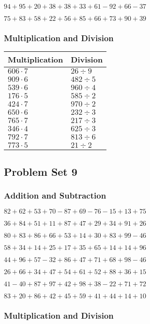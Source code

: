 \(94+95+20+38+38+33+61-92+66-37\)

\(75+83+58+22+56+85+66+73+90+39\)

\hypertarget{multiplication-and-division-7}{%
\subsubsection{Multiplication and
Division}\label{multiplication-and-division-7}}

\begin{longtable}[]{@{}ll@{}}
\toprule
Multiplication & Division\tabularnewline
\midrule
\endhead
\(606\cdot7\) & \(26÷9\)\tabularnewline
\(909\cdot6\) & \(482÷5\)\tabularnewline
\(539\cdot6\) & \(960÷4\)\tabularnewline
\(176\cdot5\) & \(585÷2\)\tabularnewline
\(424\cdot7\) & \(970÷2\)\tabularnewline
\(650\cdot6\) & \(232÷3\)\tabularnewline
\(765\cdot7\) & \(217÷3\)\tabularnewline
\(346\cdot4\) & \(625÷3\)\tabularnewline
\(792\cdot7\) & \(813÷6\)\tabularnewline
\(773\cdot5\) & \(21÷2\)\tabularnewline
\bottomrule
\end{longtable}

\hypertarget{problem-set-9}{%
\subsection{Problem Set 9}\label{problem-set-9}}

\hypertarget{addition-and-subtraction-8}{%
\subsubsection{Addition and
Subtraction}\label{addition-and-subtraction-8}}

\(82+62+53+70-87+69-76-15+13+75\)

\(36+84+51+11+87+47+29+34+91+26\)

\(80+83+86+66+53+14+30+83+99-46\)

\(58+34+14+25+17+35+65+14+14+96\)

\(44+96+57-32+86+47+71+68+98-46\)

\(26+66+34+47+54+61+52+88+36+15\)

\(41-40+87+97+42+98+38-22+71+72\)

\(83+20+86+42+45+59+41+44+14+10\)

\hypertarget{multiplication-and-division-8}{%
\subsubsection{Multiplication and
Division}\label{multiplication-and-division-8}}


